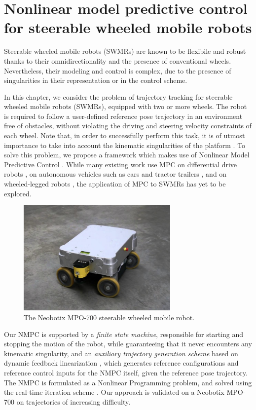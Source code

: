 \chapter{Nonlinear model predictive control for steerable wheeled mobile robots}
\label{ch:nmpc-swmr}
Steerable wheeled mobile robots (SWMRs) are known to be flexibile and robust
thanks to their omnidirectionality and the presence of conventional wheels.
Nevertheless, their modeling and control is complex, due
to the presence of singularities in their representation or in the control
scheme.

In this chapter, we consider the problem of trajectory tracking for steerable
wheeled mobile robots (SWMRs), equipped with two or more wheels.
The robot is required to follow a user-defined reference pose trajectory in
an environment free of obstacles, without violating the driving and steering
velocity constraints of each wheel. Note that, in order to successfully perform
this task, it is of utmost importance to take into account the kinematic
singularities of the platform \cite{Sorour2019RAS}. To solve this
problem, we propose a framework which makes use of
Nonlinear Model Predictive Control \cite{Rawlings2017MPCBook}.
While many existing work use MPC on differential drive robots \cite{Tarantos2023Springer},
on autonomous vehicles such as cars \cite{Zanon2014Springer} and tractor trailers
\cite{Beglini2022TMECH}, and on wheeled-legged robots \cite{Bjelonic2021IROS},
the application of MPC to SWMRs has yet to be explored.

\begin{figure}
    \centering
    \includegraphics[width=0.7\textwidth]{figures/SWMR/mpo-700.jpg}
    \caption{The Neobotix MPO-700 steerable wheeled mobile robot.}
    \label{fig:mpo-700}
\end{figure}

Our NMPC is supported by a \textit{finite state machine}, responsible for
starting and stopping the motion of the robot, while guaranteeing that it never
encounters any kinematic singularity, and
an \textit{auxiliary trajectory generation scheme} based on dynamic
feedback linearization \cite{Oriolo2002WMRControlDFL}, which generates
reference configurations and reference control inputs for the NMPC
itself, given the reference pose trajectory. 
The NMPC is formulated as a Nonlinear Programming problem, and solved using the
real-time iteration scheme \cite{Gros2020Fromlineartononlinear}.
Our approach is validated on a
Neobotix MPO-700 on trajectories of increasing difficulty.

